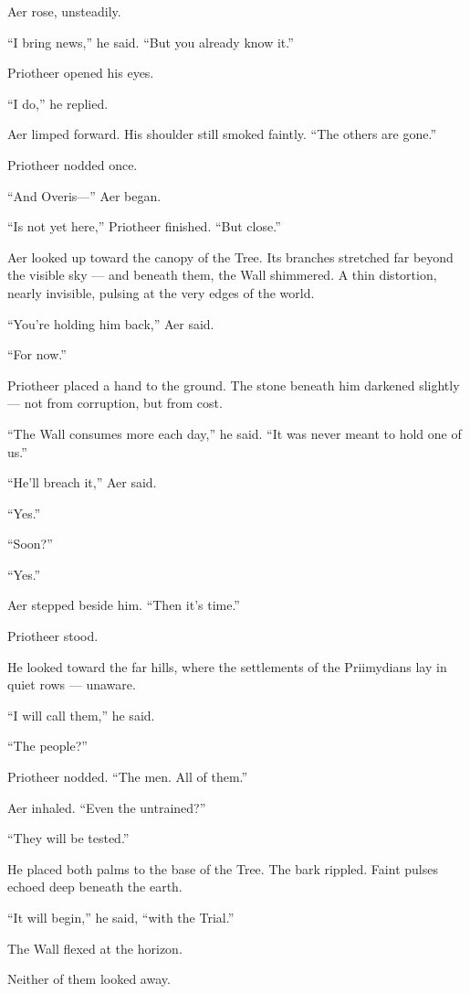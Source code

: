 \documentclass[12pt]{article}
\begin{document}
Aer rose, unsteadily.

``I bring news,'' he said. ``But you already know it.''

Priotheer opened his eyes.

``I do,'' he replied.

Aer limped forward. His shoulder still smoked faintly. ``The others are gone.''

Priotheer nodded once.

``And Overis—'' Aer began.

``Is not yet here,'' Priotheer finished. ``But close.''

Aer looked up toward the canopy of the Tree. Its branches stretched far beyond the visible sky — and beneath them, the Wall shimmered. A thin distortion, nearly invisible, pulsing at the very edges of the world.

``You’re holding him back,'' Aer said.

``For now.''

Priotheer placed a hand to the ground. The stone beneath him darkened slightly — not from corruption, but from cost.

``The Wall consumes more each day,'' he said. ``It was never meant to hold one of us.''

``He’ll breach it,'' Aer said.

``Yes.''

``Soon?''

``Yes.''

Aer stepped beside him. ``Then it’s time.''

Priotheer stood.

He looked toward the far hills, where the settlements of the Priimydians lay in quiet rows — unaware.

``I will call them,'' he said.

``The people?''

Priotheer nodded. ``The men. All of them.''

Aer inhaled. ``Even the untrained?''

``They will be tested.''

He placed both palms to the base of the Tree. The bark rippled. Faint pulses echoed deep beneath the earth.

``It will begin,'' he said, ``with the Trial.''

The Wall flexed at the horizon.

Neither of them looked away.


\dotfill
\end{document}
